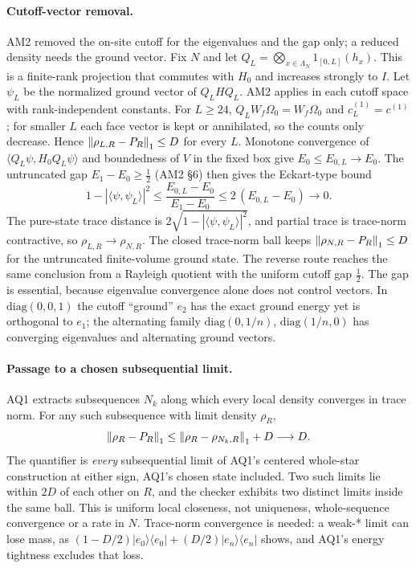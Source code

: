 \paragraph{Cutoff-vector removal.}
AM2 removed the on-site cutoff for the eigenvalues and the gap only; a reduced
density needs the ground vector. Fix $N$ and let
$Q_L=\bigotimes_{x\in\Lambda_N}1_{[0,L]}(h_x)$. This is a finite-rank
projection that commutes with $H_0$ and increases strongly to $I$. Let
$\psi_L$ be the normalized ground vector of $Q_LHQ_L$. AM2 applies in each
cutoff space with rank-independent constants. For $L\ge24$,
$Q_LW_f\Omega_0=W_f\Omega_0$ and $c^{(1)}_L=c^{(1)}$; for smaller $L$ each
face vector is kept or annihilated, so the counts only decrease. Hence
$\left\lVert\rho_{L,R}-P_R\right\rVert_1\le D$ for every $L$. Monotone convergence of
$\langle Q_L\psi,H_0Q_L\psi\rangle$ and boundedness of $V$ in the fixed box
give $E_0\le E_{0,L}\to E_0$. The untruncated gap $E_1-E_0\ge\tfrac12$ (AM2
\S6) then gives the Eckart-type bound
\begin{equation}
 1-|\langle\psi,\psi_L\rangle|^2\le\frac{E_{0,L}-E_0}{E_1-E_0}
 \le2\,(E_{0,L}-E_0)\longrightarrow0 .
 \label{eq:av1-eckart}
\end{equation}
The pure-state trace distance is $2\sqrt{1-|\langle\psi,\psi_L\rangle|^2}$,
and partial trace is trace-norm contractive, so $\rho_{L,R}\to\rho_{N,R}$. The
closed trace-norm ball keeps $\left\lVert\rho_{N,R}-P_R\right\rVert_1\le D$ for the untruncated
finite-volume ground state. The reverse route reaches the same conclusion from
a Rayleigh quotient with the uniform cutoff gap $\tfrac12$. The gap is
essential, because eigenvalue convergence alone does not control vectors. In
$\mathrm{diag}(0,0,1)$ the cutoff ``ground'' $e_2$ has the exact ground energy
yet is orthogonal to $e_1$; the alternating family $\mathrm{diag}(0,1/n)$,
$\mathrm{diag}(1/n,0)$ has converging eigenvalues and alternating ground
vectors.

\paragraph{Passage to a chosen subsequential limit.}
AQ1 extracts subsequences $N_k$ along which every local density converges in
trace norm. For any such subsequence with limit density $\rho_R$,
\begin{equation}
 \left\lVert\rho_R-P_R\right\rVert_1\le\left\lVert\rho_R-\rho_{N_k,R}\right\rVert_1+D\longrightarrow D .
 \label{eq:av1-passage}
\end{equation}
The quantifier is \emph{every} subsequential limit of AQ1's centered
whole-star construction at either sign, AQ1's chosen state included. Two such
limits lie within $2D$ of each other on $R$, and the checker exhibits two
distinct limits inside the same ball. This is uniform local closeness, not
uniqueness, whole-sequence convergence or a rate in $N$. Trace-norm
convergence is needed: a weak-* limit can lose mass, as
$(1-D/2)|e_0\rangle\langle e_0|+(D/2)|e_n\rangle\langle e_n|$ shows, and
AQ1's energy tightness excludes that loss.

